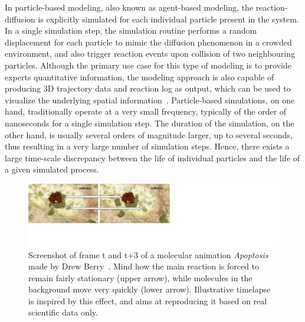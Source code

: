 In particle-based modeling, also known as agent-based modeling, the reaction-diffusion is explicitly simulated for each individual particle present in the system.
In a single simulation step, the simulation routine performs a random displacement for each particle to mimic the diffusion phenomenon in a crowded environment, and also trigger reaction events upon collision of two neighbouring particles.
Although the primary use case for this type of modeling is to provide experts quantitative information, the modeling approach is also capable of producing 3D trajectory data and reaction log as output, which can be used to visualize the underlying spatial information~\cite{falk2009visualization}.
Particle-based simulations, on one hand, traditionally operate at a very small frequency, typically of the order of nanoseconds for a single simulation step.  
The duration of the simulation, on the other hand, is usually several orders of magnitude larger, up to several seconds, thus resulting in a very large number of simulation steps.
Hence, there exists a large time-scale discrepancy between the life of individual particles and the life of a given simulated process.

\begin{figure}
	\centering
	\includegraphics[width=0.9\linewidth]{graphics/Apoptosis}
	\caption{Screenshot of frame t and t+3 of a molecular animation \textit{Apoptosis} made by Drew Berry~\cite{Apoptosis}. Mind how the main reaction is forced to remain fairly stationary
		(upper arrow), while molecules in the background move very quickly (lower arrow). Illustrative timelapse is inspired by this effect, and aims at reproducing it based on real scientific data only.}
	\label{fig:apoptosis}
\end{figure}

